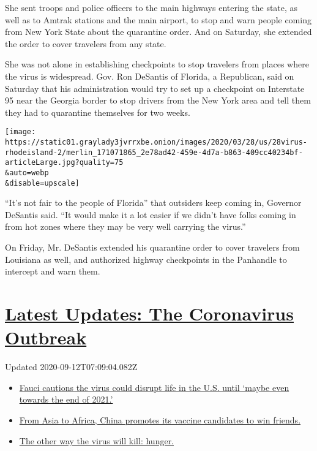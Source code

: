 She sent troops and police officers to the main highways entering the
state, as well as to Amtrak stations and the main airport, to stop and
warn people coming from New York State about the quarantine order. And
on Saturday, she extended the order to cover travelers from any state.

She was not alone in establishing checkpoints to stop travelers from
places where the virus is widespread. Gov. Ron DeSantis of Florida, a
Republican, said on Saturday that his administration would try to set up
a checkpoint on Interstate 95 near the Georgia border to stop drivers
from the New York area and tell them they had to quarantine themselves
for two weeks.

\texttt{[image: https://static01.graylady3jvrrxbe.onion/images/2020/03/28/us/28virus-rhodeisland-2/merlin\_171071865\_2e78ad42-459e-4d7a-b863-409cc40234bf-articleLarge.jpg?quality=75\\\&auto=webp\\\&disable=upscale]}

``It's not fair to the people of Florida'' that outsiders keep coming
in, Governor DeSantis said. ``It would make it a lot easier if we didn't
have folks coming in from hot zones where they may be very well carrying
the virus.''

On Friday, Mr. DeSantis extended his quarantine order to cover travelers
from Louisiana as well, and authorized highway checkpoints in the
Panhandle to intercept and warn them.

\hypertarget{latest-updates-the-coronavirus-outbreak}{%
\section{\texorpdfstring{\href{https://www.nytimes3xbfgragh.onion/2020/09/11/world/covid-19-coronavirus.html?action=click\&pgtype=Article\&state=default\&region=MAIN_CONTENT_1\&context=storylines_live_updates}{Latest
Updates: The Coronavirus
Outbreak}}{Latest Updates: The Coronavirus Outbreak}}\label{latest-updates-the-coronavirus-outbreak}}

Updated 2020-09-12T07:09:04.082Z

\begin{itemize}
\tightlist
\item
  \href{https://www.nytimes3xbfgragh.onion/2020/09/11/world/covid-19-coronavirus.html?action=click\&pgtype=Article\&state=default\&region=MAIN_CONTENT_1\&context=storylines_live_updates\#link-dfb8a16}{Fauci
  cautions the virus could disrupt life in the U.S. until `maybe even
  towards the end of 2021.'}
\item
  \href{https://www.nytimes3xbfgragh.onion/2020/09/11/world/covid-19-coronavirus.html?action=click\&pgtype=Article\&state=default\&region=MAIN_CONTENT_1\&context=storylines_live_updates\#link-7104d154}{From
  Asia to Africa, China promotes its vaccine candidates to win friends.}
\item
  \href{https://www.nytimes3xbfgragh.onion/2020/09/11/world/covid-19-coronavirus.html?action=click\&pgtype=Article\&state=default\&region=MAIN_CONTENT_1\&context=storylines_live_updates\#link-393ad215}{The
  other way the virus will kill: hunger.}
\end{itemize}

